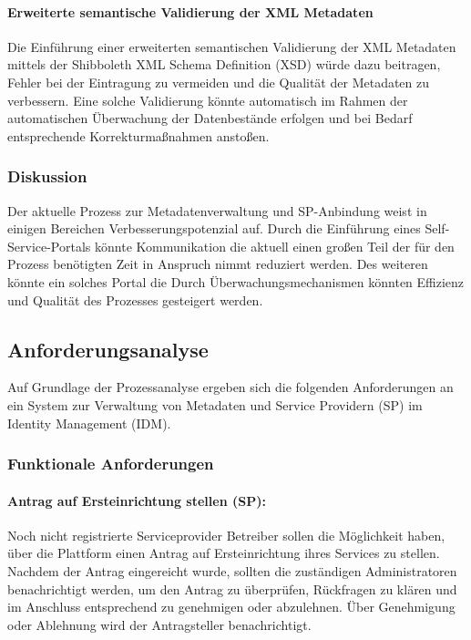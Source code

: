 \paragraph{Erweiterte semantische Validierung der XML Metadaten}
Die Einführung einer erweiterten semantischen Validierung der XML Metadaten mittels der Shibboleth XML Schema Definition (XSD) würde dazu beitragen, Fehler bei der Eintragung zu vermeiden und die Qualität der Metadaten zu verbessern.
Eine solche Validierung könnte automatisch im Rahmen der automatischen Überwachung der Datenbestände erfolgen und bei Bedarf entsprechende Korrekturmaßnahmen anstoßen.

\subsubsection{Diskussion}\label{subsubsec:prozessanalyse-discussion}
Der aktuelle Prozess zur Metadatenverwaltung und SP-Anbindung weist in einigen Bereichen Verbesserungspotenzial auf.
Durch die Einführung eines Self-Service-Portals könnte Kommunikation die aktuell einen großen Teil der für den Prozess benötigten Zeit in Anspruch nimmt reduziert werden.
Des weiteren könnte ein solches Portal die 
Durch Überwachungsmechanismen könnten Effizienz und Qualität des Prozesses gesteigert werden.

\subsection{Anforderungsanalyse}\label{subsec:anforderungsanalyse-results}
Auf Grundlage der Prozessanalyse ergeben sich die folgenden Anforderungen an ein System zur Verwaltung von Metadaten und Service Providern (SP) im Identity Management (IDM).

\subsubsection{Funktionale Anforderungen}\label{subsubsec:functional-requirements}
\paragraph{Antrag auf Ersteinrichtung stellen (SP):}
Noch nicht registrierte Serviceprovider Betreiber sollen die Möglichkeit haben, über die Plattform einen Antrag auf Ersteinrichtung ihres Services zu stellen.
Nachdem der Antrag eingereicht wurde, sollten die zuständigen Administratoren benachrichtigt werden, um den Antrag zu überprüfen, Rückfragen zu klären und im Anschluss entsprechend zu genehmigen oder abzulehnen. 
Über Genehmigung oder Ablehnung wird der Antragsteller benachrichtigt.

